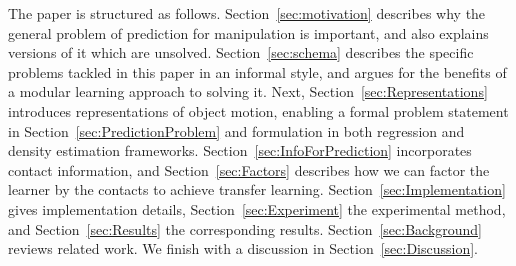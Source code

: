 The paper is structured as follows.  Section~\ref{sec:motivation} describes why the general problem of prediction for manipulation is important, and also explains versions of it which are unsolved. Section~\ref{sec:schema} describes the specific problems tackled in this paper in an informal style, and argues for the benefits of a modular learning approach to solving it. Next, Section~\ref{sec:Representations} introduces representations of object motion, enabling a formal problem statement in Section~\ref{sec:PredictionProblem} and formulation in both regression and density estimation frameworks. Section~\ref{sec:InfoForPrediction} incorporates contact information, and Section~\ref{sec:Factors} describes how we can factor the learner by the contacts to achieve transfer learning. Section~\ref{sec:Implementation} gives implementation details, Section~\ref{sec:Experiment} the experimental method, and Section~\ref{sec:Results}
the corresponding results. Section~\ref{sec:Background} reviews related work.  We finish with a discussion in Section~\ref{sec:Discussion}.
